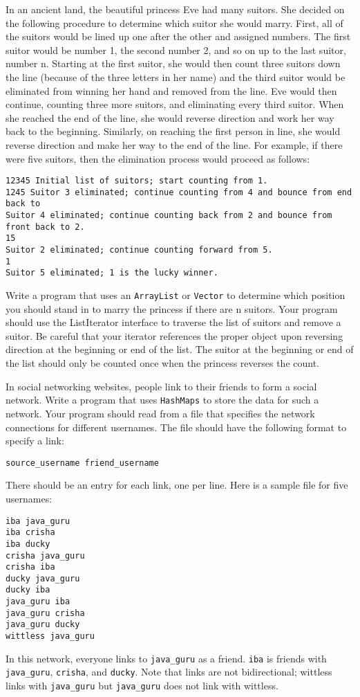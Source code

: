 \begin{questions}
In an ancient land, the beautiful princess Eve had many suitors. She decided on
the following procedure to determine which suitor she would marry. First, all of
the suitors would be lined up one after the other and assigned numbers. The first
suitor would be number 1, the second number 2, and so on up to the last suitor,
number n. Starting at the first suitor, she would then count three suitors down
the line (because of the three letters in her name) and the third suitor would be
eliminated from winning her hand and removed from the line. Eve would then
continue, counting three more suitors, and eliminating every third suitor. When
she reached the end of the line, she would reverse direction and work her way back
to the beginning. Similarly, on reaching the first person in line, she would reverse
direction and make her way to the end of the line.
For example, if there were five suitors, then the elimination process would
proceed as follows:
\begin{verbatim}
12345 Initial list of suitors; start counting from 1.
1245 Suitor 3 eliminated; continue counting from 4 and bounce from end
back to 
Suitor 4 eliminated; continue counting back from 2 and bounce from
front back to 2.
15
Suitor 2 eliminated; continue counting forward from 5.
1
Suitor 5 eliminated; 1 is the lucky winner.
\end{verbatim}
Write a program that uses an \texttt{ArrayList} or \texttt{Vector} to determine which position
you should stand in to marry the princess if there are n suitors. Your program
should use the ListIterator interface to traverse the list of suitors and remove
a suitor. Be careful that your iterator references the proper object upon reversing
direction at the beginning or end of the list. The suitor at the beginning or end of
the list should only be counted once when the princess reverses the count.



\question

In social networking websites, people link to their friends to form a social network.
Write a program that uses \texttt{HashMaps} to store the data for such a network. Your
program should read from a file that specifies the network connections for different
usernames. The file should have the following format to specify a link:
\begin{verbatim}
source_username friend_username
\end{verbatim}
There should be an entry for each link, one per line. Here is a sample file for five
usernames:
\begin{verbatim}
iba java_guru
iba crisha
iba ducky
crisha java_guru
crisha iba
ducky java_guru
ducky iba
java_guru iba
java_guru crisha
java_guru ducky
wittless java_guru
\end{verbatim}
In this network, everyone links to \texttt{java\_guru} as a friend. \texttt{iba} is
friends with \texttt{java\_guru}, \texttt{crisha}, and \texttt{ducky}. Note that links are not
bidirectional; wittless links with \texttt{java\_guru} but \texttt{java\_guru} does not link with wittless.


\end{questions}
